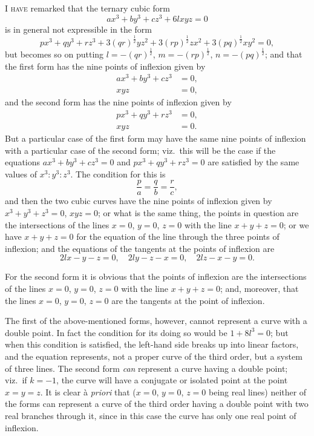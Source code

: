 \documentclass[11pt,a4paper]{article}
\theoremstyle{plain}
\theoremstyle{definition}
\begin{document}
\textsc{I have} remarked that the ternary cubic form
\[
ax^3 + by^3 + cz^3 + 6lxyz = 0
\]
is in general not expressible in the form
\[
px^3 + qy^3 + rz^3 + 3(qr)^{\frac{1}{2}}yz^2 + 3(rp)^{\frac{1}{2}}zx^2 + 3(pq)^{\frac{1}{2}}xy^2 = 0,
\]
but becomes so on putting $l = -(qr)^{\frac{1}{2}}$, $m = -(rp)^{\frac{1}{2}}$, $n = -(pq)^{\frac{1}{2}}$; and that the first form has the nine points of inflexion given by
\begin{align*}
ax^3 + by^3 + cz^3 &= 0, \\
xyz &= 0,
\end{align*}
and the second form has the nine points of inflexion given by
\begin{align*}
px^3 + qy^3 + rz^3 &= 0, \\
xyz &= 0.
\end{align*}
But a particular case of the first form may have the same nine points of inflexion with a particular case of the second form; viz.\ this will be the case if the equations $ax^3 + by^3 + cz^3 = 0$ and $px^3 + qy^3 + rz^3 = 0$ are satisfied by the same values of $x^3 : y^3 : z^3$. The condition for this is
\[
\frac{p}{a} = \frac{q}{b} = \frac{r}{c},
\]
and then the two cubic curves have the nine points of inflexion given by $x^3 + y^3 + z^3 = 0$, $xyz = 0$; or what is the same thing, the points in question are the intersections of the lines $x=0$, $y=0$, $z=0$ with the line $x+y+z=0$; or we have $x+y+z=0$ for the equation of the line through the three points of inflexion; and the equations of the tangents at the points of inflexion are
\[
2lx - y - z = 0, \quad 2ly - z - x = 0, \quad 2lz - x - y = 0.
\]

For the second form it is obvious that the points of inflexion are the intersections of the lines $x=0$, $y=0$, $z=0$ with the line $x+y+z=0$; and, moreover, that the lines $x=0$, $y=0$, $z=0$ are the tangents at the point of inflexion.

The first of the above-mentioned forms, however, cannot represent a curve with a double point. In fact the condition for its doing so would be $1 + 8l^3 = 0$; but when this condition is satisfied, the left-hand side breaks up into linear factors, and the equation represents, not a proper curve of the third order, but a system of three lines. The second form \textit{can} represent a curve having a double point; viz.\ if $k=-1$, the curve will have a conjugate or isolated point at the point $x=y=z$. It is clear \`{a} \textit{priori} that ($x=0$, $y=0$, $z=0$ being real lines) neither of the forms can represent a curve of the third order having a double point with two real branches through it, since in this case the curve has only one real point of inflexion.
\end{document}
